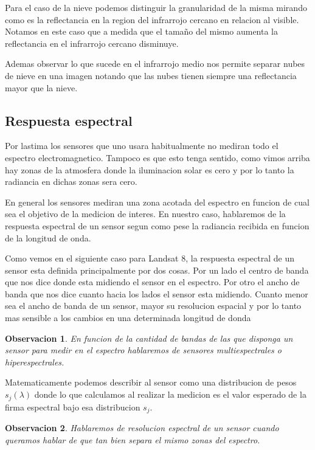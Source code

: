 \documentclass[a4paper,12pt]{article}
\newtheorem*{obs}{Observacion}
\begin{document}
Para el caso de la nieve podemos distinguir la granularidad de la misma mirando
como es la reflectancia en la region del infrarrojo cercano en relacion al
visible. Notamos en este caso que a medida que el tamaño del mismo aumenta la
reflectancia en el infrarrojo cercano disminuye. 

Ademas observar lo que sucede en el infrarrojo medio nos permite separar nubes
de nieve en una imagen notando que las nubes tienen siempre una reflectancia
mayor que la nieve.

\subsection{Respuesta espectral}

Por lastima los sensores que uno usara habitualmente no mediran todo el espectro
electromagnetico. Tampoco es que esto tenga sentido, como vimos arriba hay zonas
de la atmosfera donde la iluminacion solar es cero y por lo tanto la radiancia
en dichas zonas sera cero.

En general los sensores mediran una zona acotada del espectro en funcion de cual
sea el objetivo de la medicion de interes. En nuestro caso, hablaremos de la
respuesta espectral de un sensor segun como pese la radiancia recibida en
funcion de la longitud de onda.

Como vemos en el siguiente caso para Landsat 8, la respuesta espectral de un
sensor esta definida principalmente por dos cosas. Por un lado el centro de
banda que nos dice donde esta midiendo el sensor en el espectro. Por otro el
ancho de banda que nos dice cuanto hacia los lados el sensor esta midiendo.
Cuanto menor sea el ancho de banda de un sensor, mayor su resolucion espacial y
por lo tanto mas sensible a los cambios en una determinada longitud de donda

\begin{obs}
  En funcion de la cantidad de bandas de las que disponga un sensor para medir
  en el espectro hablaremos de sensores multiespectrales o hiperespectrales.
\end{obs}

Matematicamente podemos describir al sensor como una distribucion de pesos
$s_j(\lambda)$ donde lo que calculamos al realizar la medicion es el valor
esperado de la firma espectral bajo esa distribucion $s_j$. 

\begin{obs}
  Hablaremos de resolucion espectral de un sensor cuando queramos hablar de que
  tan bien separa el mismo zonas del espectro.
\end{obs}  
\end{document}
